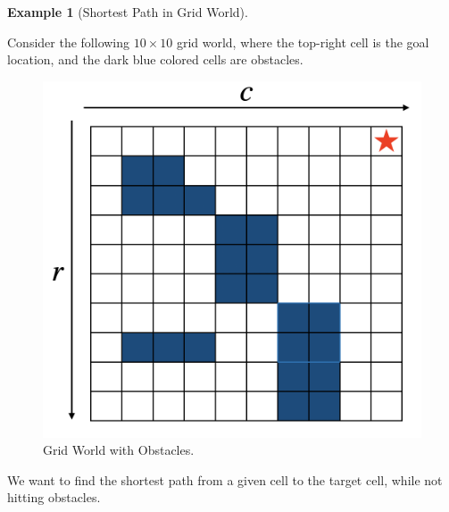 \documentclass[
]{book}
\theoremstyle{definition}
\theoremstyle{definition}
\newtheorem{example}{Example}[chapter]
\theoremstyle{definition}
\theoremstyle{definition}
\theoremstyle{remark}
\begin{document}
\begin{example}[Shortest Path in Grid World]
\protect\hypertarget{exm:gridworld}{}\label{exm:gridworld}

Consider the following \(10 \times 10\) grid world, where the top-right cell is the goal location, and the dark blue colored cells are obstacles.

\begin{figure}

{\centering \includegraphics[width=0.5\linewidth]{images/grid-world-obstacle} 

}

\caption{Grid World with Obstacles.}\label{fig:grid-world}
\end{figure}

We want to find the shortest path from a given cell to the target cell, while not hitting obstacles.


\end{example}
\end{document}
